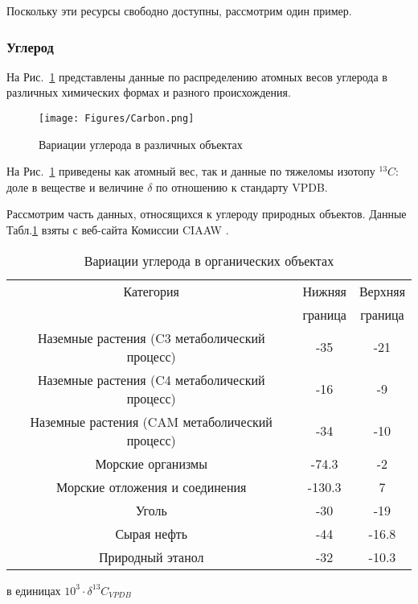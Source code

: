 \documentclass[a5paper,openany]{book}
\begin{document}
Поскольку эти ресурсы свободно доступны, рассмотрим один пример.

\subsubsection{Углерод} \label{s:CarbonData}

На Рис.~\ref{f:CarbonVariation} представлены данные по распределению атомных весов углерода в различных химических формах и разного происхождения.
\begin{figure}[ht] 
	\centering\small
	\texttt{[image: Figures/Carbon.png]}
	\caption{Вариации углерода в различных объектах} 
	\label{f:CarbonVariation}
\end{figure}

На Рис.~\ref{f:CarbonVariation} приведены как атомный вес, так и данные по тяжеломы изотопу $^{13}C$: доле в веществе и величине  $\delta$ по отношению к стандарту VPDB.

Рассмотрим часть данных, относящихся к углероду природных объектов. Данные Табл.\ref{t:OrganicCarbonVariation} взяты  с веб-сайта Комиссии CIAAW \cite{CIAAWnaturalVariation}.

\begin{table}[h!]
	\begin{center}
		{\small
			\begin{tabular}{ccc}
				\hline
				Категория & Нижняя & Верхняя \\
				~ & граница & граница \\ 
				\hline
				Наземные растения (C3 метаболический процесс)	& -35 & -21 \\
				Наземные растения (C4 метаболический процесс)	& -16 & -9 \\
				Наземные растения  (CAM метаболический процесс)	& -34 & -10 \\
				\hline
				Морские организмы 	& -74.3 & -2 \\
				Морские отложения и соединения &	-130.3 & 7 \\
				\hline
				Уголь &	-30 & -19 \\
				Сырая нефть &	-44 & -16.8 \\
				Природный этанол & -32 &  -10.3 \\
				\hline
			\end{tabular}
		}
		\caption{Вариации углерода в органических объектах} в единицах $10^3 \cdot \delta ^{13}C_{VPDB}$
		\label{t:OrganicCarbonVariation}
	\end{center}
\end{table}
\end{document}
